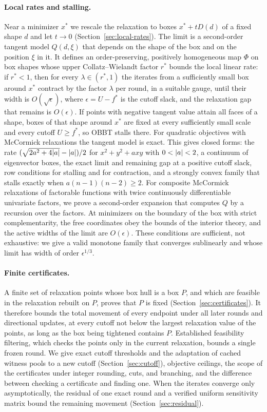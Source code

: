 \paragraph{Local rates and stalling.} Near a minimizer $x^*$ we rescale the
relaxation to boxes $x^*+tD(d)$ of a fixed shape $d$ and let $t\to0$
(Section~\ref{sec:local-rates}). The limit is a second-order tangent model
$Q(d,\xi)$ that depends on the shape of the box and on the position $\xi$ in
it. It defines an order-preserving, positively homogeneous map $\Phi$ on box
shapes whose upper Collatz--Wielandt factor $r^*$ bounds the local linear
rate: if $r^*<1$, then for every $\lambda\in(r^*,1)$ the iterates from a
sufficiently small box around $x^*$ contract by the factor $\lambda$ per
round, in a suitable gauge, until their width is $O(\sqrt\epsilon)$, where
$\epsilon=U-f^*$ is the cutoff slack, and the relaxation gap that remains is
$O(\epsilon)$. If points with negative tangent value attain all faces of a
shape, boxes of that shape around $x^*$ are fixed at every sufficiently
small scale and every cutoff $U\ge f^*$, so OBBT stalls there. For
quadratic objectives with McCormick relaxations the tangent model is exact.
This gives closed forms: the rate $(\sqrt{2a^2+4\lvert a\rvert}-\lvert a\rvert)/2$ for
$x^2+y^2+axy$ with $0<\lvert a\rvert<2$, a continuum of eigenvector boxes, the exact
limit and remaining gap at a positive cutoff slack, row conditions for
stalling and for contraction, and a strongly convex family that stalls
exactly when $a(n-1)(n-2)\ge2$. For
composite McCormick relaxations of factorable functions with twice
continuously differentiable univariate factors, we prove a second-order
expansion that computes $Q$ by a recursion over the factors. At minimizers
on the boundary of the box with strict complementarity, the free coordinates
obey the bounds of the interior theory, and the active widths of the limit
are $O(\epsilon)$.
These conditions are sufficient, not exhaustive: we give a valid monotone
family that converges sublinearly and whose limit has width of order
$\epsilon^{1/3}$.

\paragraph{Finite certificates.} A finite set of relaxation points whose box
hull is a box $P$, and which are feasible in the relaxation rebuilt on $P$,
proves that $P$ is fixed (Section~\ref{sec:certificates}). It therefore
bounds the total movement of every endpoint under all later rounds and
directional updates, at every cutoff not below the largest relaxation value
of the points, as long as the box being tightened contains $P$. Established feasibility filtering, which
checks the points only in the current relaxation, bounds a single frozen
round. We give exact cutoff thresholds and the adaptation of cached witness
pools to a new cutoff (Section~\ref{sec:cutoff}), objective ceilings, the
scope of the certificates under integer rounding, cuts, and branching, and
the difference between checking a certificate and finding one. When the
iterates converge only asymptotically, the residual of one exact round and a
verified uniform sensitivity matrix bound the remaining movement
(Section~\ref{sec:residual}).

